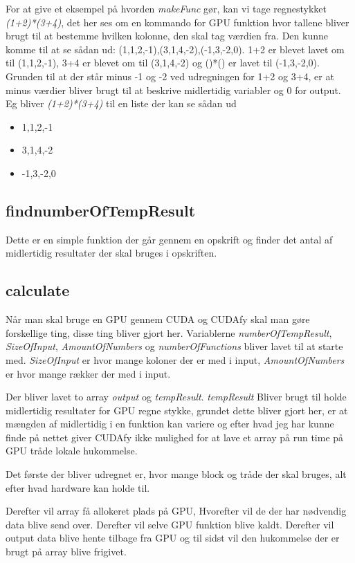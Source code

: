 For at give et eksempel på hvorden \textit{makeFunc} gør, kan vi tage regnestykket \textit{(1+2)*(3+4)}, det her ses om en kommando for GPU funktion hvor tallene bliver brugt til at bestemme hvilken kolonne, den skal tag værdien fra. Den kunne komme til at se sådan ud: (1,1,2,-1),(3,1,4,-2),(-1,3,-2,0). 1+2 er blevet lavet om til (1,1,2,-1), 3+4 er blevet om til (3,1,4,-2) og ()*() er lavet til (-1,3,-2,0). Grunden til at der står minus -1 og -2 ved udregningen for 1+2 og 3+4, er at minus værdier bliver brugt til at beskrive midlertidig variabler og 0 for output. Eg bliver \textit{(1+2)*(3+4)} til en liste der kan se sådan ud
\begin{itemize}
 \item 1,1,2,-1
 \item 3,1,4,-2
 \item -1,3,-2,0
\end{itemize}


\subsection{findnumberOfTempResult}
Dette er en simple funktion der går gennem en opskrift og finder det antal af midlertidig resultater der skal bruges i opskriften.

\subsection{calculate}
Når man skal bruge en GPU gennem CUDA og CUDAfy skal man gøre forskellige ting, disse ting bliver gjort her. Variablerne \textit{numberOfTempResult}, \textit{SizeOfInput}, \textit{AmountOfNumbers} og \textit{numberOfFunctions} bliver lavet til at starte med. \textit{SizeOfInput} er hvor mange koloner der er med i input, \textit{AmountOfNumbers} er hvor mange rækker der med i input.

Der bliver lavet to array \textit{output} og \textit{tempResult}. \textit{tempResult} Bliver brugt til holde midlertidig resultater for GPU regne stykke, grundet dette bliver gjort her, er at mængden af midlertidig i en funktion kan variere og efter hvad jeg har kunne finde på nettet giver CUDAfy ikke mulighed for at lave et array på run time på GPU tråde lokale hukommelse.

Det første der bliver udregnet er, hvor mange block og tråde der skal bruges, alt efter hvad hardware kan holde til.

Derefter vil array få allokeret plads på GPU, Hvorefter vil de der har nødvendig data blive send over. Derefter vil selve GPU funktion blive kaldt. Derefter vil output data blive hente tilbage fra GPU og til sidst vil den hukommelse der er brugt på array blive frigivet.

